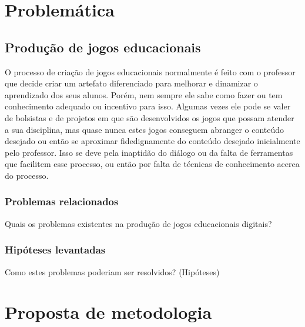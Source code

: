 \documentclass[
	12pt,				%
	openright,			%
	twoside,			%
	a4paper,			%
	english,			%
	french,				%
	spanish,			%
	brazil				%
	]{abntex2}
\begin{document}
\part{Problemática}

\chapter{Produção de jogos educacionais}

O processo de criação de jogos educacionais normalmente é feito com o professor que decide criar um artefato diferenciado para melhorar e dinamizar o aprendizado dos seus alunos. Porém, nem sempre ele sabe como fazer ou tem conhecimento adequado ou incentivo para isso. Algumas vezes ele pode se valer de bolsistas e de projetos em que são desenvolvidos os jogos que possam atender a sua disciplina, mas quase nunca estes jogos conseguem abranger o conteúdo desejado ou então se aproximar fidedignamente do conteúdo desejado inicialmente pelo professor. Isso se deve pela inaptidão do diálogo ou da falta de ferramentas que facilitem esse processo, ou então por falta de técnicas de conhecimento acerca do processo.

\section{Problemas relacionados}

Quais os problemas existentes na produção de jogos educacionais digitais?

\section{Hipóteses levantadas}

Como estes problemas poderiam ser resolvidos? (Hipóteses)




\part{Proposta de metodologia}
\end{document}
